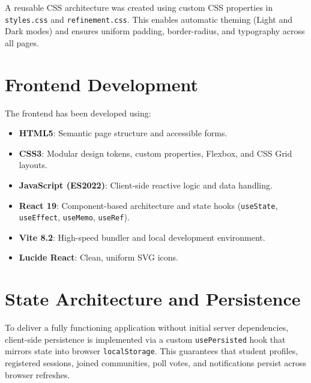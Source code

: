 \documentclass[12pt,a4paper]{report}
\begin{document}
A reusable CSS architecture was created using custom CSS properties in \texttt{styles.css} and \texttt{refinement.css}. This enables automatic theming (Light and Dark modes) and ensures uniform padding, border-radius, and typography across all pages.

\section{Frontend Development}
The frontend has been developed using:
\begin{itemize}
    \item \textbf{HTML5}: Semantic page structure and accessible forms.
    \item \textbf{CSS3}: Modular design tokens, custom properties, Flexbox, and CSS Grid layouts.
    \item \textbf{JavaScript (ES2022)}: Client-side reactive logic and data handling.
    \item \textbf{React 19}: Component-based architecture and state hooks (\texttt{useState}, \texttt{useEffect}, \texttt{useMemo}, \texttt{useRef}).
    \item \textbf{Vite 8.2}: High-speed bundler and local development environment.
    \item \textbf{Lucide React}: Clean, uniform SVG icons.
\end{itemize}

\section{State Architecture and Persistence}
To deliver a fully functioning application without initial server dependencies, client-side persistence is implemented via a custom \texttt{usePersisted} hook that mirrors state into browser \texttt{localStorage}. This guarantees that student profiles, registered sessions, joined communities, poll votes, and notifications persist across browser refreshes.
\end{document}
